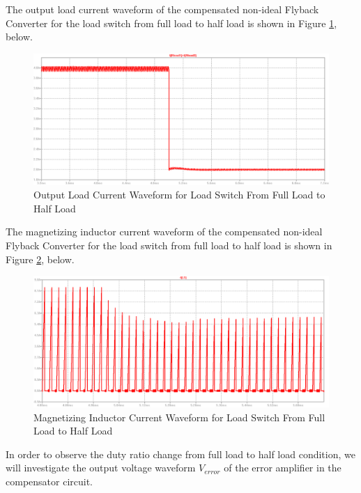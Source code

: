 The output load current waveform of the compensated non-ideal Flyback Converter for the load switch from full load to half load is shown in Figure \ref{com:Iload_FH}, below.

\begin{figure}[H]
\begin{center}
\includegraphics[width=1\textwidth]{comp_simulations/Iload_FH.png}
\caption{Output Load Current Waveform for Load Switch From Full Load to Half Load}
\label{com:Iload_FH}
\end{center}
\end{figure}

The magnetizing inductor current waveform of the compensated non-ideal Flyback Converter for the load switch from full load to half load is shown in Figure \ref{com:ILm_FH}, below.

\begin{figure}[H]
\begin{center}
\includegraphics[width=1\textwidth]{comp_simulations/ILm_FH.png}
\caption{Magnetizing Inductor Current Waveform for Load Switch From Full Load to Half Load}
\label{com:ILm_FH}
\end{center}
\end{figure}

In order to observe the duty ratio change from full load to half load condition, we will investigate the output voltage waveform $V_{error}$ of the error amplifier in the compensator circuit.

